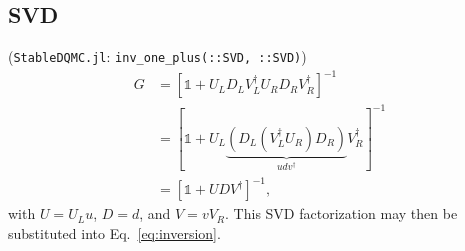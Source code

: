 \documentclass[submission, Phys]{SciPost}
\begin{document}
\begin{appendix}
\subsection{SVD}

(\texttt{StableDQMC.jl}: \texttt{inv\_one\_plus(::SVD, ::SVD)})
\begin{align}
G &= \left[\mathbb{1} + U_L D_L V_L^\dagger U_R D_R V_R^\dagger \right]^{-1} \nonumber \\
&= \left[\mathbb{1} + U_L \underbrace{\left( D_L \left( V_L^\dagger U_R \right) D_R \right)}_{udv^\dagger} V_R^\dagger \right]^{-1} \\
&= \left[\mathbb{1} + U D V^\dagger \right]^{-1},\nonumber
\end{align}
with $U=U_Lu$, $D=d$, and $V=v V_R$. This SVD factorization may then be substituted into Eq.~\eqref{eq:inversion}.

	
\end{appendix}







\nolinenumbers
\end{document}
